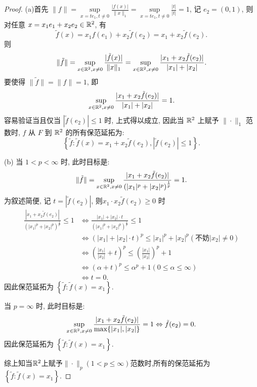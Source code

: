 \begin{proof}
    (a)首先 $\|f\|=\sup\limits_{x=te_1,t\neq 0}\frac{|f(x)|}{\|x\|_1}=\sup\limits_{x=te_1,t\neq0}\frac{|t|}{|t|}=1$,
    记 $e_2=(0,1)$, 则对任意 $x=x_1e_1+x_2e_2\in\mathbb{R}^2$, 有
    \[\tilde{f}(x)=x_1f(e_1)+x_2\tilde{f}(e_2)=x_1+x_2\tilde{f}(e_2).\]
    则
    \[\|\tilde{f}\|=\sup_{x\in\mathbb{R}^2,x\neq 0}\frac{|\tilde{f}(x)|}{\|x\|_1}=\sup_{x\in\mathbb{R}^2,x\neq 0}\frac{|x_1+x_2\tilde{f}(e_2)|}{|x_1|+|x_2|}.\]
    要使得 $\|\tilde{f}\|=\|f\|=1$, 即
    \[\sup_{x\in\mathbb{R}^2,x\neq 0}\frac{|x_1+x_2\tilde{f}(e_2)|}{|x_1|+|x_2|}=1.\]
    容易验证当且仅当 $|\tilde{f}(e_2)|\leq 1$ 时, 上式得以成立, 
    因此当 $\mathbb{R}^2$ 上赋予 $\|\cdot\|_1$ 范数时, $f$ 从 $F$ 到 $\mathbb{R}^2$ 的所有保范延拓为:
    \[\left\{\tilde{f}\colon\tilde{f}(x)=x_1+x_2\tilde{f}(e_2),|\tilde{f}(e_2)|\leq1\right\}.\]

    (b) 当 $1<p<\infty$ 时, 此时目标是:
    \[\|\tilde{f}\|=\sup_{x\in\mathbb{R}^2,x\neq0}\frac{|x_1+x_2\tilde{f}(e_2)|}{\left(|x_1|^p+|x_2|^p\right)^{\frac{1}{p}}}=1.\]
    为叙述简便, 记 $t=|\tilde{f}(e_2)|$, 则$x_1\cdot x_2\tilde{f}(e_2)\geq 0$ 时
    \[\begin{split}\frac{|x_1+x_2\tilde{f}(e_2)|}{\left(|x_1|^p+|x_2|^p\right)^{\frac{1}{p}}}\leq 1
    &\Leftrightarrow \frac{|x_1|+|x_2|\cdot t}{\left(|x_1|^p+|x_2|^p\right)^{\frac{1}{p}}}\leq1\\
    &\Leftrightarrow (|x_1|+|x_2|\cdot t)^p\leq|x_1|^p+|x_2|^p(\mbox{不妨}|x_2|\neq0)\\
    &\Leftrightarrow\left(\frac{|x_1|}{|x_2|}+t\right)^p\leq\left(\frac{|x_1|}{|x_2|}\right)^p+1\\
    &\Leftrightarrow (\alpha+t)^p\leq\alpha^p+1(0\leq\alpha\leq\infty)\\
    &\Leftrightarrow t=0.
    \end{split}\]
    因此保范延拓为 $\left\{\tilde{f}:\tilde{f}(x)=x_1\right\}$.
    
    当 $p=\infty$ 时, 此时目标是:
    \[\sup_{x\in\mathbb{R}^2,x\neq 0}\frac{|x_1+x_2\tilde{f}(e_2)|}{\max\{|x_1|,|x_2|\}}=1\Leftrightarrow\tilde{f}(e_2)=0.\]
    因此保范延拓为 $\left\{\tilde{f}:\tilde{f}(x)=x_1\right\}$.

    综上知当$\mathbb{R}^2$上赋予$\|\cdot\|_p(1<p\leq\infty)$范数时,所有的保范延拓为$\left\{\tilde{f}:\tilde{f}(x)=x_1\right\}$.
\end{proof}




